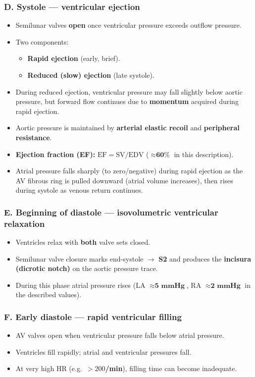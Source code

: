 \documentclass[11pt,a4paper]{article}
\begin{document}
\subsubsection{D. Systole --- ventricular ejection}
\begin{itemize}
\item Semilunar valves \textbf{open} once ventricular pressure exceeds outflow pressure.
\item Two components:
  \begin{itemize}
  \item \textbf{Rapid ejection} (early, brief).
  \item \textbf{Reduced (slow) ejection} (late systole).
  \end{itemize}
\item During reduced ejection, ventricular pressure may fall slightly below aortic pressure, but forward flow continues due to \textbf{momentum} acquired during rapid ejection.
\item Aortic pressure is maintained by \textbf{arterial elastic recoil} and \textbf{peripheral resistance}.
\item \textbf{Ejection fraction (EF):} $\mathrm{EF}=\mathrm{SV}/\mathrm{EDV}$ ($\approx \textbf{60\%}$ in this description).
\item Atrial pressure falls sharply (to zero/negative) during rapid ejection as the AV fibrous ring is pulled downward (atrial volume increases), then rises during systole as venous return continues.
\end{itemize}

\subsubsection{E. Beginning of diastole --- isovolumetric ventricular relaxation}
\begin{itemize}
\item Ventricles relax with \textbf{both} valve sets closed.
\item Semilunar valve closure marks end-systole $\rightarrow$ \textbf{S2} and produces the \textbf{incisura (dicrotic notch)} on the aortic pressure trace.
\item During this phase atrial pressure rises (LA $\approx \textbf{5 mmHg}$, RA $\approx \textbf{2 mmHg}$ in the described values).
\end{itemize}

\subsubsection{F. Early diastole --- rapid ventricular filling}
\begin{itemize}
\item AV valves open when ventricular pressure falls below atrial pressure.
\item Ventricles fill rapidly; atrial and ventricular pressures fall.
\item At very high HR (e.g.\ \textbf{$>200$/min}), filling time can become inadequate.
\end{itemize}
\end{document}
